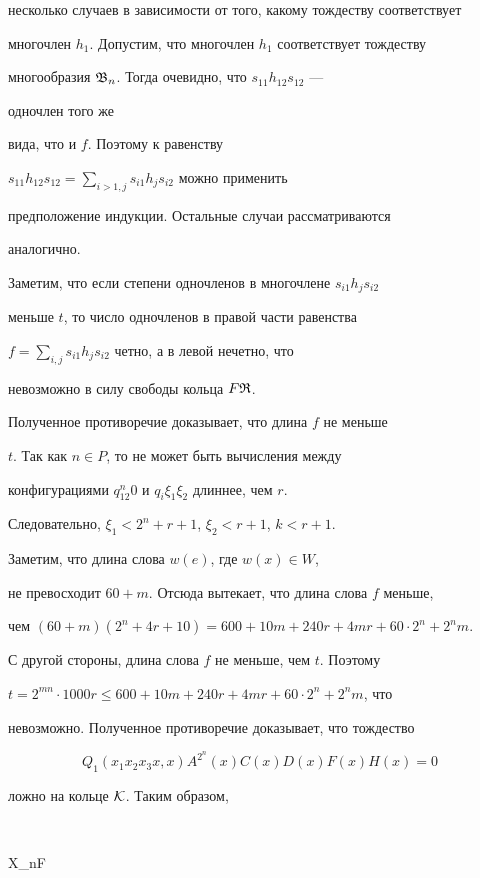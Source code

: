 несколько случаев в зависимости от того, какому тождеству соответствует  


многочлен $h_1$. Допустим, что многочлен $h_1$ соответствует тождеству  


многообразия $\frak B_n$. Тогда очевидно, что $s_{11}h_{12}s_{12}$ --- 


одночлен того же  


вида, что и $f$. Поэтому к равенству 


$s_{11}h_{12}s_{12}=\sum\limits_{i>1,j}s_{i1}h_j s_{i2}$ можно применить  


предположение индукции. Остальные случаи рассматриваются  


аналогично. 


 


Заметим, что если степени одночленов в многочлене $s_{i1}h_j s_{i2}$ 


меньше $t$, то число одночленов в правой части равенства 


$f=\sum\limits_{i,j}s_{i1}h_j s_{i2}$ четно, а в левой нечетно, что 


невозможно в силу свободы кольца $F\frak R$. 


Полученное противоречие доказывает, что длина $f$ не меньше  


$t$. Так как $n\in P$, то не может быть вычисления между  


конфигурациями $q_12^n0$ и $q_i\xi_1\xi_2$ длиннее, чем $r$. 


Следовательно, $\xi_1<2^n+r+1$, $\xi_2<r+1$, $k<r+1$. 


Заметим, что длина слова $w(e)$, где $w(x)\in W$, 


не превосходит $60+m$. Отсюда вытекает, что длина слова $f$ меньше,  


чем $(60+m)(2^n+4r+10)=600+10m+240r+4mr+60\cdot 2^n+2^n m$. 


С другой стороны, длина слова $f$ не меньше, чем $t$. Поэтому 


$t=2^{mn}\cdot 1000 r\le 600+10m+240r+4mr+60\cdot 2^n+2^n m$, что 


невозможно. Полученное противоречие доказывает, что тождество 


$$ 


Q_1(x_1x_2x_3x,x)A^{2^n}(x)C(x)D(x)F(x)H(x)=0 


$$ 


ложно на кольце $\cal K$. Таким образом, 


$$ 


\frak X_n\cap\frak F\vDash 


